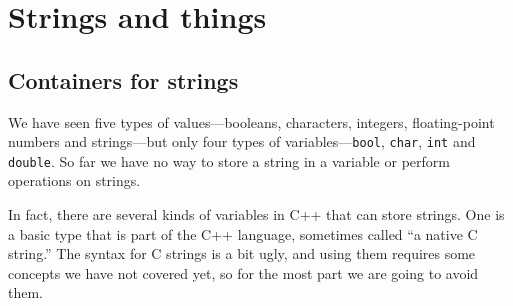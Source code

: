 





\chapter{Strings and things}
\label{strings}

\section{Containers for strings}

We have seen five types of values---booleans, characters, integers,
floating-point numbers and strings---but only four types of
variables---{\tt bool}, {\tt char}, {\tt int} and {\tt double}.  So
far we have no way to store a string in a variable or perform
operations on strings.

In fact, there are several kinds of variables in C++ that
can store strings.  One is a basic type that is part of the C++
language, sometimes called ``a native C string.''  The syntax
for C strings is a bit ugly, and using them requires some concepts
we have not covered yet, so for the most part we are going to
avoid them.

